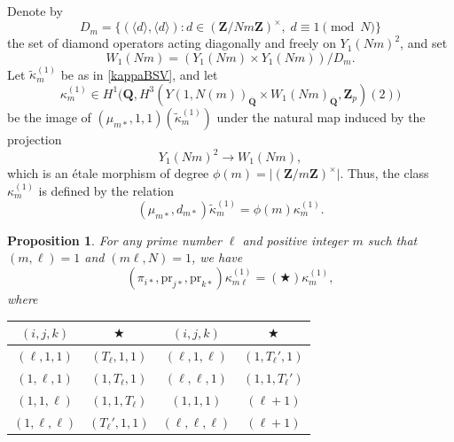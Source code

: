 \documentclass[10pt,letterpaper]{amsart}
\theoremstyle{plain}
\theoremstyle{definition}
\theoremstyle{definition}
\theoremstyle{plain}
\newtheorem{prop}[thm]{Proposition}
\theoremstyle{plain}
\theoremstyle{plain}
\theoremstyle{remark}
\numberwithin{equation}{section}
\DeclareMathOperator{\et}{\acute{e}t}
\newcommand{\Q}{\mathbf{Q}}
\newcommand{\Z}{\mathbf{Z}}
\begin{document}
Denote by 
\begin{equation}\label{eq:diamond-Dm}
D_m=\{(\langle d\rangle,\langle d\rangle): d\in (\Z/Nm\Z)^{\times},\; d\equiv 1\pmod{N}\}
\end{equation}
the set of diamond operators acting diagonally and freely on $Y_1(Nm)^2$, and set 
\[
W_1(Nm)=(Y_1(Nm)\times Y_1(Nm))/D_m.
\]
Let $\tilde{\kappa}_m^{(1)}$ be as in \eqref{kappaBSV}, and let 
\[
\kappa_{m}^{(1)}\in H^1\bigl(\Q,H^3_{\et}(Y(1,N(m))_{\overline{\Q}}\times W_1(Nm)_{\overline{\Q}},\Z_p)(2)\bigr)
\]
be the image of $(\mu_{m*},1,1)(\tilde{\kappa}_m^{(1)})$ under the
natural map induced by the projection \[Y_1(Nm)^2\rightarrow W_1(Nm),\] which is an \'etale morphism of degree $\phi(m)=\vert(\Z/m\Z)^\times\vert$. 
Thus, the class $\kappa_m^{(1)}$ is defined by the relation
\begin{equation}\label{def-relation}
(\mu_{m*},d_{m*})\tilde{\kappa}^{(1)}_{m}=\phi(m)\kappa^{(1)}_m.
\end{equation}

\begin{prop}\label{correcttable}
For any prime number $\ell$ and positive integer $m$ such that $(m,\ell)=1$ and $(m\ell,N)=1$, we have
\begin{equation*}
    (\pi_{i*},{\mathrm{pr}}_{j*},{\mathrm{pr}}_{k*})\kappa_{m\ell}^{(1)}= (\bigstar)\kappa_{m}^{(1)},
\end{equation*}
where
\begin{center}
\begin{tabular}{|c|c|c|c| } 
 \hline
 $(i,j,k)$ & $\bigstar$  & $(i,j,k)$ & $\bigstar$ \\ 
 \hline
  $(\ell,1,1)$& $(T_\ell,1,1)$ &  $(\ell,1,\ell)$& $(1,T_\ell',1)$  \\ 
  $(1,\ell,1)$&  $(1,T_\ell,1)$  & $(\ell,\ell,1)$& $(1,1,T_\ell')$   \\
  $(1,1,\ell)$& $(1,1,T_\ell)$ & $(1,1,1)$& $(\ell+1)$ \\
  $(1,\ell,\ell)$& $(T_\ell',1,1)$ &  $(\ell,\ell,\ell)$&  $(\ell+1)$  \\
 \hline
\end{tabular}
\end{center}
\end{prop}
\end{document}
